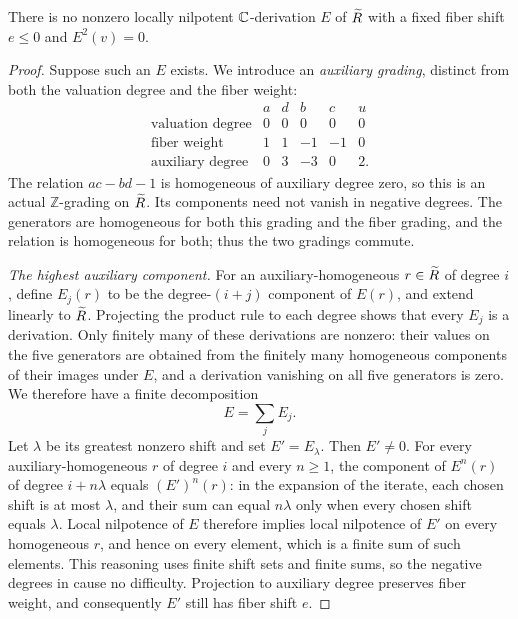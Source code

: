 \begin{proposition}\label{prop:rigidity}
There is no nonzero locally nilpotent $\mathbb C$-derivation $E$ of
$\widetilde R$ with a fixed fiber shift $e\le0$ and $E^2(v)=0$.
\end{proposition}

\begin{proof}
Suppose such an $E$ exists.  We introduce an \emph{auxiliary
grading}, distinct from both the valuation degree and the fiber
weight:
\begin{equation}\label{rig:auxiliary-grading}
 \begin{array}{c|rrrrr}
  &a&d&b&c&u\\ \hline
  \text{valuation degree}&0&0&0&0&0\\
  \text{fiber weight}&1&1&-1&-1&0\\
  \text{auxiliary degree}&0&3&-3&0&2.
 \end{array}
\end{equation}
The relation $ac-bd-1$ is homogeneous of auxiliary degree zero,
so this is an actual $\mathbb Z$-grading on $\widetilde R$.  Its components
need not vanish in negative degrees.  The generators are
homogeneous for both this grading and the fiber grading, and the
relation is homogeneous for both; thus the two gradings commute.

\medskip\noindent
\emph{The highest auxiliary component.}
For an auxiliary-homogeneous $r\in\widetilde R$ of degree $i$, define
$E_j(r)$ to be the degree-$(i+j)$ component of $E(r)$, and extend
linearly to $\widetilde R$.  Projecting the product rule to each degree
shows that every $E_j$ is a derivation.  Only finitely many of
these derivations are nonzero: their values on the five generators
are obtained from the finitely many homogeneous components of
their images under $E$, and a derivation vanishing on all five
generators is zero.  We therefore have a finite decomposition
\[
 E=\sum_j E_j.
\]
Let $\lambda$ be its greatest nonzero shift and set $E'=E_\lambda$.
Then $E'\ne0$.  For every auxiliary-homogeneous $r$ of degree $i$
and every $n\ge1$, the component of $E^n(r)$ of degree
$i+n\lambda$ equals $(E')^n(r)$: in the expansion of the iterate,
each chosen shift is at most $\lambda$, and their sum can equal
$n\lambda$ only when every chosen shift equals $\lambda$.
Local nilpotence of $E$ therefore implies local nilpotence of
$E'$ on every homogeneous $r$, and hence on every element, which
is a finite sum of such elements.  This reasoning uses finite
shift sets and finite sums, so the negative degrees in
 cause no difficulty.  Projection
to auxiliary degree preserves fiber weight, and consequently
$E'$ still has fiber shift $e$.


\end{proof}
